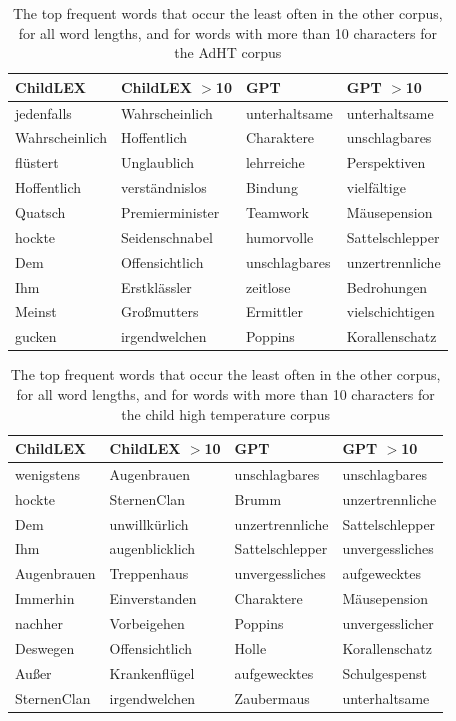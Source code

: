 \documentclass[doc, a4paper]{apa7}
\begin{document}
\begin{table}[!htbp]
\caption{The top frequent words that occur the least often in the other corpus, for all word lengths, and for words with more than 10 characters for the AdHT corpus}
\centering
\begin{tabular}{llll}
  \hline
ChildLEX & ChildLEX $>$10 & GPT & GPT $>$10 \\ 
  \hline
jedenfalls & Wahrscheinlich & unterhaltsame & unterhaltsame \\ 
  Wahrscheinlich & Hoffentlich & Charaktere & unschlagbares \\ 
  flüstert & Unglaublich & lehrreiche & Perspektiven \\ 
  Hoffentlich & verständnislos & Bindung & vielfältige \\ 
  Quatsch & Premierminister & Teamwork & Mäusepension \\ 
  hockte & Seidenschnabel & humorvolle & Sattelschlepper \\ 
  Dem & Offensichtlich & unschlagbares & unzertrennliche \\ 
  Ihm & Erstklässler & zeitlose & Bedrohungen \\ 
  Meinst & Großmutters & Ermittler & vielschichtigen \\ 
  gucken & irgendwelchen & Poppins & Korallenschatz \\ 
   \hline
\end{tabular}
\label{words-adht-low}
\end{table}

\begin{table}[!htbp]
\caption{The top frequent words that occur the least often in the other corpus, for all word lengths, and for words with more than 10 characters for the child high temperature corpus}
\centering
\begin{tabular}{llll}
  \hline
ChildLEX & ChildLEX $>$10 & GPT & GPT $>$10 \\ 
  \hline
wenigstens & Augenbrauen & unschlagbares & unschlagbares \\ 
  hockte & SternenClan & Brumm & unzertrennliche \\ 
  Dem & unwillkürlich & unzertrennliche & Sattelschlepper \\ 
  Ihm & augenblicklich & Sattelschlepper & unvergessliches \\ 
  Augenbrauen & Treppenhaus & unvergessliches & aufgewecktes \\ 
  Immerhin & Einverstanden & Charaktere & Mäusepension \\ 
  nachher & Vorbeigehen & Poppins & unvergesslicher \\ 
  Deswegen & Offensichtlich & Holle & Korallenschatz \\ 
  Außer & Krankenflügel & aufgewecktes & Schulgespenst \\ 
  SternenClan & irgendwelchen & Zaubermaus & unterhaltsame \\ 
   \hline
\end{tabular}
\label{words-chlt-low}
\end{table}
\end{document}
